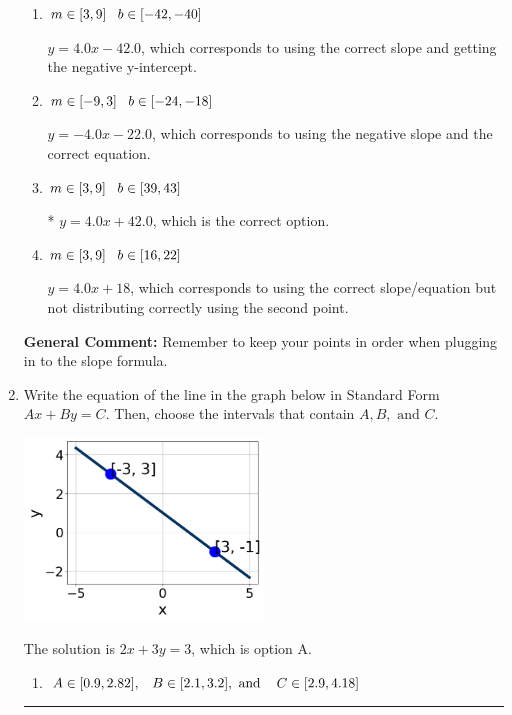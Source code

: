 \documentclass{extbook}[14pt]
\newcommand{\litem}[1]{\item #1

\rule{\textwidth}{0.4pt}}
\begin{document}
\begin{enumerate}
{\begin{enumerate}[label=\Alph*.]
 $y = 4.0x + 15$, which corresponds to using the correct slope/equation but not distributing correctly using the first point.
\item \( m \in [3, 9] \hspace*{3mm} b \in [-42, -40] \)

 $y = 4.0x -42.0$, which corresponds to using the correct slope and getting the negative y-intercept.
\item \( m \in [-9, 3] \hspace*{3mm} b \in [-24, -18] \)

 $y = -4.0x -22.0$, which corresponds to using the negative slope and the correct equation.
\item \( m \in [3, 9] \hspace*{3mm} b \in [39, 43] \)

* $y = 4.0x + 42.0$, which is the correct option.
\item \( m \in [3, 9] \hspace*{3mm} b \in [16, 22] \)

 $y = 4.0x + 18$, which corresponds to using the correct slope/equation but not distributing correctly using the second point.
\end{enumerate}

\textbf{General Comment:} Remember to keep your points in order when plugging in to the slope formula.
}
\litem{
Write the equation of the line in the graph below in Standard Form $Ax+By=C$. Then, choose the intervals that contain $A, B, \text{ and } C$.

\begin{center}
    \includegraphics[width=0.5\textwidth]{../Figures/linearGraphToStandardCopyC.png}
\end{center}


The solution is \( 2x + 3y = 3 \), which is option A.\begin{enumerate}[label=\Alph*.]
\item \( A \in [0.9, 2.82], \hspace{3mm} B \in [2.1, 3.2], \text{ and } \hspace{3mm} C \in [2.9, 4.18] \)


\end{enumerate}}
\end{enumerate}
\end{document}

